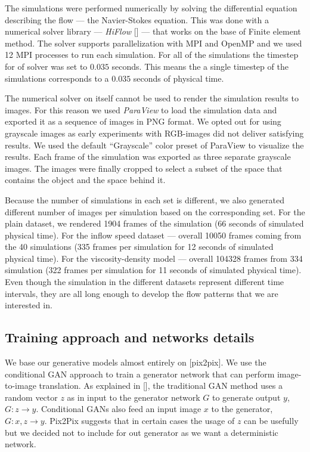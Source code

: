 \documentclass{llncs}
\begin{document}
The simulations were performed numerically by solving the differential equation describing the flow --- the Navier-Stokes equation. This was done with a numerical solver library --- \emph{HiFlow} [] ---  that works on the base of Finite element method. The solver supports parallelization with MPI and OpenMP and we used 12 MPI processes to run each simulation. For all of the simulations the timestep for of solver was set to $0.035$ seconds. This means the a single timestep of the simulations corresponds to a $0.035$ seconds of physical time.

The numerical solver on itself cannot be used to render the simulation results to images. For this reason we used \emph{ParaView} to load the simulation data and exported it as a sequence of images in PNG format. We opted out for using grayscale images as early experiments with RGB-images did not deliver satisfying results. We used the default ``Grayscale'' color preset of ParaView to visualize the results. Each frame of the simulation was exported as three separate grayscale images. The images were finally cropped to select a subset of the space that contains the object and the space behind it.

Because the number of simulations in each set is different, we also generated different number of images per simulation based on the corresponding set. For the plain dataset, we rendered 1904 frames of the simulation (66 seconds of simulated physical time). For the inflow speed dataset --- overall 10050 frames coming from the 40 simulations (335 frames per simulation for 12 seconds of simulated physical time). For the viscosity-density model --- overall 104328 frames from 334 simulation (322 frames per simulation for 11 seconds of simulated physical time). Even though the simulation in the different datasets represent different time intervals, they are all long enough to develop the flow patterns that we are interested in.

\subsection{Training approach and networks details}
We base our generative models almost entirely on [pix2pix]. We use the conditional GAN approach to train a generator network that can perform image-to-image translation. As explained in [], the traditional GAN method uses a random vector $z$ as in input to the generator network $G$ to generate output $y$, $G:z \rightarrow y$. Conditional GANs also feed an input image $x$ to the generator, $G: x,z \rightarrow y$. Pix2Pix suggests that in certain cases the usage of $z$ can be usefully but we decided not to include for out generator as we want a deterministic network.
\end{document}
